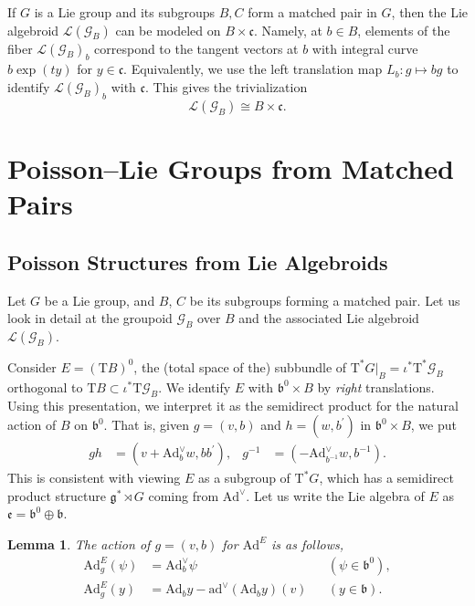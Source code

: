 \documentclass[a4paper,11pt]{amsart}
\newcommand{\s}[1]{\mathcal{#1}}
\newcommand{\fr}[1]{\mathfrak{#1}}
\newcommand{\rT}{\mathrm T}
\newcommand{\pr}{\prime}
\newcommand{\Ad}{\mathrm{Ad}}
\newcommand{\ad}{\mathrm{ad}}
\newtheorem{lem}[thm]{Lemma}
\theoremstyle{definition}
\theoremstyle{remark}
\begin{document}
If $G$ is a Lie group and its subgroups $B, C$ form a matched pair in $G$, then the Lie algebroid $\s{L}(\s{G}_B)$ can be modeled on $B \times \fr{c}$.
Namely, at $b \in B$, elements of the fiber $\s{L}(\s{G}_B)_b$ correspond to the tangent vectors at $b$ with integral curve $b \exp(t y)$ for $y \in \fr{c}$.
Equivalently, we use the left translation map $L_b \colon g \mapsto b g$ to identify $\s{L}(\s{G}_B)_b$ with $\fr{c}$.
This gives the trivialization
\begin{equation}
\label{eq:Lie-algebroid-trivialization}
\s{L}(\s{G}_B) \cong B \times \fr{c}.
\end{equation}

\section{Poisson--Lie Groups from Matched Pairs}
\label{sec:PL-grps-from-matched-pairs}

\subsection{Poisson Structures from Lie Algebroids}

Let $G$ be a Lie group, and $B$, $C$ be its subgroups forming a matched pair.
Let us look in detail at the groupoid $\s{G}_B$ over $B$ and the associated Lie algebroid $\s{L}(\s{G}_B)$.

Consider $E = (\rT B)^0$, the (total space of the) subbundle of $\rT^* G|_B = \iota^* \rT^* \s{G}_B$ orthogonal to $\rT B \subset \iota^* \rT \s{G}_B$.
We identify $E$ with $\fr{b}^0 \times B$ by \emph{right} translations.
Using this presentation, we interpret it as the semidirect product for the natural action of $B$ on $\fr{b}^0$.
That is, given $g = (v,b)$ and $h = (w,b^\pr)$ in $\fr{b}^0 \times B$, we put
\begin{align*}
g h &= (v + \Ad^\vee_b w , b b^\pr) , &
g^{-1} &= \left( - \Ad^\vee_{b^{-1}} w , b^{-1} \right).
\end{align*}
This is consistent with viewing $E$ as a subgroup of $\rT^*G$, which has a semidirect product structure $\fr{g}^* \rtimes G$ coming from $\Ad^\vee$.
Let us write the Lie algebra of $E$ as $\fr{e} = \fr{b}^0 \oplus \fr{b}$.

\begin{lem}
The action of $g = (v, b)$ for $\Ad^{E}$ is as follows,
\begin{align}
\label{eq:ADEAZ} \Ad^{E}_g (\psi) &= \Ad^\vee_b \psi && (\psi \in \fr{b}^0),\\
 \label{eq:ADEA} \Ad^{E}_g (y) &= \Ad_b y - \ad^\vee ( \Ad_b y ) (v) && (y \in \fr{b}).
\end{align}
\end{lem}
\end{document}
